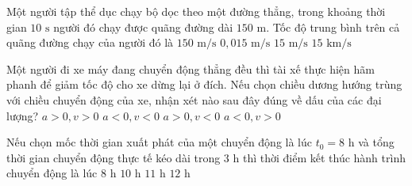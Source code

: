 \begin{ex}%
	Một người tập thể dục chạy bộ dọc theo một đường thẳng, trong khoảng thời gian $10\text{ s}$ người đó chạy được quãng đường dài $150\text{ m}$. Tốc độ trung bình trên cả quãng đường chạy của người đó là
	\choice
	{$150\text{ m/s}$}
	{$0,015\text{ m/s}$}
	{\True $15\text{ m/s}$}
	{$15\text{ km/s}$}
\end{ex}

\begin{ex}%
	Một người đi xe máy đang chuyển động thẳng đều thì tài xế thực hiện hãm phanh để giảm tốc độ cho xe dừng lại ở đích. Nếu chọn chiều dương hướng trùng với chiều chuyển động của xe, nhận xét nào sau đây đúng về dấu của các đại lượng?
	\choice
	{$a > 0, v > 0$}
	{$a < 0, v < 0$}
	{$a > 0, v < 0$}
	{\True $a < 0, v > 0$}
\end{ex}

\begin{ex}%
	Nếu chọn mốc thời gian xuất phát của một chuyển động là lúc $t_{0}=8\text{ h}$ và tổng thời gian chuyển động thực tế kéo dài trong $3\text{ h}$ thì thời điểm kết thúc hành trình chuyển động là lúc
	\choice
	{$8\text{ h}$}
	{$10\text{ h}$}
	{\True $11\text{ h}$}
	{$12\text{ h}$}
\end{ex}

